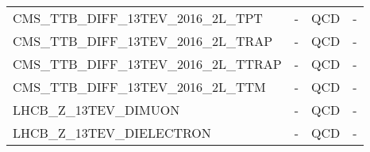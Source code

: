 \begin{center}
{\begin{tabular}{llll}
        CMS\_TTB\_DIFF\_13TEV\_2016\_2L\_TPT   &                 - &       QCD &            - \\
        CMS\_TTB\_DIFF\_13TEV\_2016\_2L\_TRAP  &                 - &       QCD &            - \\
        CMS\_TTB\_DIFF\_13TEV\_2016\_2L\_TTRAP &                 - &       QCD &            - \\
        CMS\_TTB\_DIFF\_13TEV\_2016\_2L\_TTM   &                 - &       QCD &            - \\
        LHCB\_Z\_13TEV\_DIMUON              &                 - &       QCD &            - \\
        LHCB\_Z\_13TEV\_DIELECTRON          &                 - &       QCD &            - \\
        \bottomrule
        \end{tabular}}
\end{center}